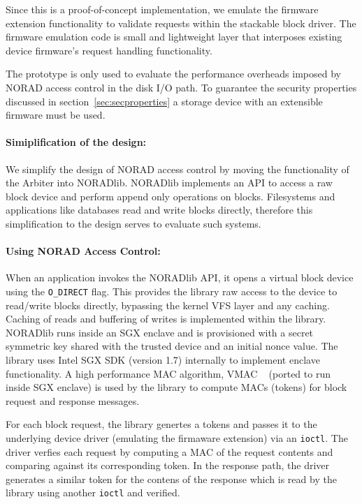 \documentclass[withindex,glossary]{cam-thesis}
\begin{document}
Since this is a proof-of-concept implementation, we emulate the firmware extension functionality to validate requests within the stackable block driver.
The firmware emulation code is small and lightweight layer that interposes existing device firmware's request handling functionality.

The prototype is only used to evaluate the performance overheads imposed by NORAD access control in the disk I/O path. 
To guarantee the security properties discussed in section~\ref{sec:secproperties} a storage device with an extensible firmware must be used.

\paragraph {Simiplification of the design:}
We simplify the design of NORAD access control by moving the functionality of the Arbiter into NORADlib.
NORADlib implements an API to access a raw block device and perform append only operations on blocks.
Filesystems and applications like databases read and write blocks directly, therefore this simplification to the design serves to evaluate such systems.

\paragraph {Using NORAD Access Control:}
When an application invokes the NORADlib API, it opens a virtual block device using the \texttt{O\_DIRECT} flag.
This provides the library raw access to the device to read/write blocks directly, bypassing the kernel VFS layer and any caching.
Caching of reads and buffering of writes is implemented within the library.
NORADlib runs inside an SGX enclave and is provisioned with a secret symmetric key shared with the trusted device and an initial nonce value.
The library uses Intel SGX SDK (version 1.7) internally to implement enclave functionality.
A high performance MAC algorithm, VMAC ~\cite{vmac} (ported to run inside SGX enclave) is used by the library to compute MACs (tokens) for block request and response messages.

For each block request, the library genertes a tokens and passes it to the underlying device driver (emulating the firmaware extension) via an \texttt{ioctl}.
The driver verfies each request by computing a MAC of the request contents and comparing against its corresponding token.
In the response path, the driver generates a similar token for the contens of the response which is read by the library using another \texttt{ioctl} and verified.
\end{document}
